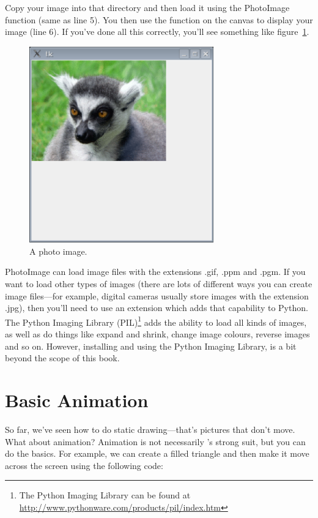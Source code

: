 Copy your image into that directory and then load it using the PhotoImage function (same as line 5). You then use the  function on the canvas to display your image (line 6). If you've done all this correctly, you'll see something like figure~\ref{fig43}.

\begin{figure}
\begin{center}
\includegraphics[width=80mm]{eps/figure43.eps}
\end{center}
\caption{A photo image.}\label{fig43}
\end{figure}

PhotoImage can load image files with the extensions .gif, .ppm and .pgm. If you want to load other types of images (there are lots of different ways you can create image files---for example, digital cameras usually store images with the extension .jpg), then you'll need to use an extension which adds that capability to Python. The Python Imaging Library (PIL)\footnote{The Python Imaging Library can be found at \href{http://www.pythonware.com/products/pil/index.htm}{http://www.pythonware.com/products/pil/index.htm}} adds the ability to load all kinds of images, as well as do things like expand and shrink, change image colours, reverse images and so on. However, installing and using the Python Imaging Library, is a bit beyond the scope of this book.

\section{Basic Animation}

So far, we've seen how to do static drawing---that's pictures that don't move. What about animation? Animation is not necessarily 's strong suit, but you can do the basics. For example, we can create a filled triangle and then make it move across the screen using the following code:

